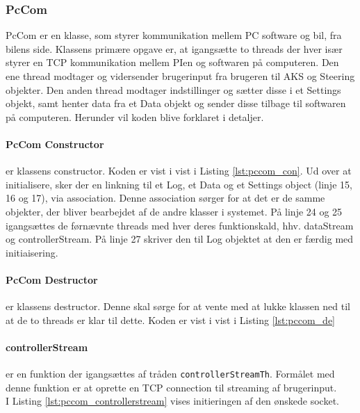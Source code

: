 \subsubsection{PcCom} \label{sec:pccom_impl}

PcCom er en klasse, som styrer kommunikation mellem PC software og bil, fra bilens side. Klassens primære opgave er, at igangsætte to threads der hver især styrer en TCP kommunikation mellem PIen og softwaren på computeren. Den ene thread modtager og vidersender brugerinput fra brugeren til AKS og Steering objekter. Den anden thread modtager indstillinger og sætter disse i et Settings objekt, samt henter data fra et Data objekt og sender disse tilbage til softwaren på computeren.
Herunder vil koden blive forklaret i detaljer.


\paragraph{PcCom Constructor} er klassens constructor. Koden er vist i vist i Listing \ref{lst:pccom_con}. Ud over at initialisere, sker der en linkning til et Log, et Data og et Settings object (linje 15, 16 og 17), via association. Denne association sørger for at det er de samme objekter, der bliver bearbejdet af de andre klasser i systemet. På linje 24 og 25 igangsættes de førnævnte threads med hver deres funktionskald, hhv. dataStream og controllerStream. På linje 27 skriver den til Log objektet at den er færdig med initiaisering.



\paragraph{PcCom Destructor} er klassens destructor. Denne skal sørge for at vente med at lukke klassen ned til at de to threads er klar til dette. Koden er vist i vist i Listing \ref{lst:pccom_de}



\clearpage

\paragraph{controllerStream} er en funktion der igangsættes af tråden \texttt{controllerStreamTh}. Formålet med denne funktion er at oprette en TCP connection til streaming af brugerinput.\\
I Listing \ref{lst:pccom_controllerstream} vises initieringen af den ønskede socket. 

